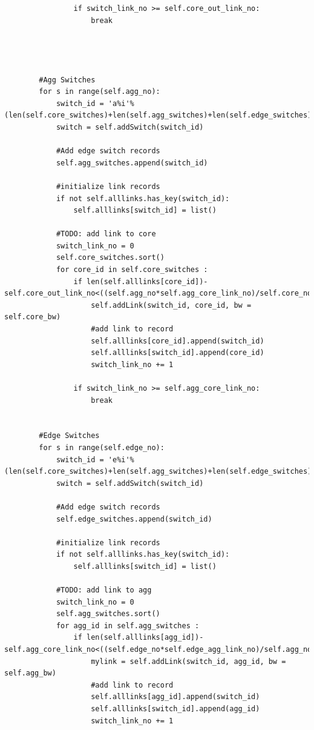 \documentclass[12pt,english,oneside]{book}
\begin{document}
\begin{lstlisting}
                if switch_link_no >= self.core_out_link_no:
                    break
            
            
             
            
        #Agg Switches
        for s in range(self.agg_no):
            switch_id = 'a%i'%(len(self.core_switches)+len(self.agg_switches)+len(self.edge_switches)+1)
            switch = self.addSwitch(switch_id)
            
            #Add edge switch records
            self.agg_switches.append(switch_id)
            
            #initialize link records
            if not self.alllinks.has_key(switch_id):
                self.alllinks[switch_id] = list()
            
            #TODO: add link to core
            switch_link_no = 0
            self.core_switches.sort()
            for core_id in self.core_switches :
                if len(self.alllinks[core_id])-self.core_out_link_no<((self.agg_no*self.agg_core_link_no)/self.core_no):
                    self.addLink(switch_id, core_id, bw = self.core_bw)
                    #add link to record
                    self.alllinks[core_id].append(switch_id)
                    self.alllinks[switch_id].append(core_id)
                    switch_link_no += 1
                    
                if switch_link_no >= self.agg_core_link_no:
                    break

                    
        #Edge Switches
        for s in range(self.edge_no):
            switch_id = 'e%i'%(len(self.core_switches)+len(self.agg_switches)+len(self.edge_switches)+1)
            switch = self.addSwitch(switch_id)
            
            #Add edge switch records
            self.edge_switches.append(switch_id)
            
            #initialize link records
            if not self.alllinks.has_key(switch_id):
                self.alllinks[switch_id] = list()
            
            #TODO: add link to agg
            switch_link_no = 0
            self.agg_switches.sort()
            for agg_id in self.agg_switches :
                if len(self.alllinks[agg_id])-self.agg_core_link_no<((self.edge_no*self.edge_agg_link_no)/self.agg_no):
                    mylink = self.addLink(switch_id, agg_id, bw = self.agg_bw)
                    #add link to record
                    self.alllinks[agg_id].append(switch_id)
                    self.alllinks[switch_id].append(agg_id)
                    switch_link_no += 1
                    

\end{lstlisting}
\end{document}
